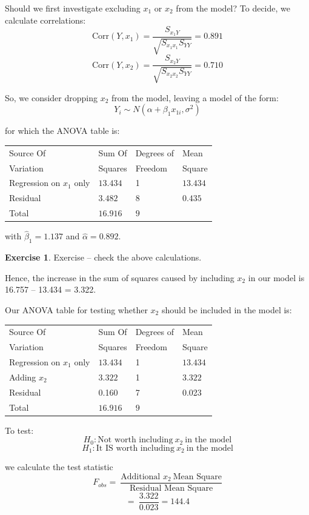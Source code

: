 \documentclass[12pt,a4paper,openany,twoside]{report}
\theoremstyle{definition}
\newtheorem*{exer*}{Exercise}
\theoremstyle{remark}
\theoremstyle{plain}
\newcommand{\vsps}{\vspace{.5cm}}
\theoremstyle{definition}
\theoremstyle{definition}
\theoremstyle{definition}
\theoremstyle{remark}
\begin{document}
Should we first investigate excluding \(x_{1}\) or \(x_{2}\) from the
model? To decide, we calculate correlations:
\[\text{Corr}(Y,x_{1}) = \frac{S_{x_{1}Y}}{\sqrt{S_{x_{1}x_{1}}S_{YY}}} = 0.891 \]
\[\text{Corr}(Y,x_{2}) = \frac{S_{x_{2}Y}}{\sqrt{S_{x_{2}x_{2}}S_{YY}}} = 0.710\]

So, we consider dropping \(x_{2}\) from the model, leaving a model of
the form:
\[Y_{i}\sim N(\alpha + \beta_{1}x_{1i},\sigma^{2})\]

for which the ANOVA table is:\newline

\begin{longtable}[c]{@{}llll@{}}
\toprule
Source Of & Sum Of & Degrees of & Mean \\
Variation & Squares & Freedom & Square
\tabularnewline
\midrule
\endhead
Regression on $x_{1}$ only  & \(13.434\) & 1 &
\(13.434\)\tabularnewline
Residual & \(3.482\) & 8 & \(0.435\)\tabularnewline
Total & \(16.916\) & \(9\) &\tabularnewline
\bottomrule
\end{longtable}
\vsps

with \({\hat{\beta}}_{1} = 1.137\) and \(\hat{\alpha} = 0.892.\)
\vsps

\begin{exer*}  Exercise -- check the above calculations.
\end{exer*}
\vsps

Hence, the increase in the sum of squares caused by including \(x_{2}\)
in our model is 16.757 -- 13.434 = 3.322.

Our ANOVA table for testing whether \(x_{2}\) should be included in
the model is:\newline

\begin{longtable}[c]{@{}p{5cm}p{3cm}lp{3cm}@{}}
\toprule
Source Of & Sum Of & Degrees of & Mean \\
Variation & Squares & Freedom & Square
\tabularnewline
\midrule
\endhead
Regression on $x_{1}$ only  & \(13.434\) & 1 & \(13.434\)\tabularnewline
Adding $x_{2}$ & \(3.322\) & 1 &
\(3.322\)\tabularnewline
Residual & 0.160 & 7 & 0.023\tabularnewline
Total & \(16.916\) & \(9\) &\tabularnewline
\bottomrule
\end{longtable}
\vsps

To test:
\[H_{0}: \text{Not worth including} \ x_{2}\ \text{in the model}\]
\[H_{1}: \text{It IS worth including} \ x_{2}\ \text{in the model}\]

we calculate the test statistic
\[F_{obs} = \ \frac{\text{Additional\ }x_{2}\ \text{Mean Square}}{\text{Residual\ Mean\ Square}}\]
\[= \ \frac{3.322}{0.023} = 144.4\]
\end{document}
